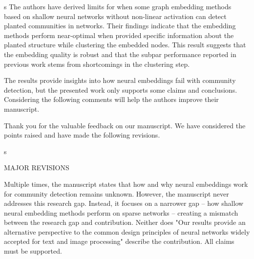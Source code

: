 \documentclass[12pt]{article}
\newcounter{comment}[subsection]
\newcommand{\rcomment}[1]{%
\vspace{10pt}
\begin{sectionbox}
s #1
\end{sectionbox}
}
\begin{document}
\rcomment{%
The authors have derived limits for when some graph embedding methods based on shallow neural networks without non-linear activation can detect planted communities in networks. Their findings indicate that the embedding methods perform near-optimal when provided specific information about the planted structure while clustering the embedded nodes. This result suggests that the embedding quality is robust and that the subpar performance reported in previous work stems from shortcomings in the clustering step. 

The results provide insights into how neural embeddings fail with community detection, but the presented work only supports some claims and conclusions. Considering the following comments will help the authors improve their manuscript.
}

Thank you for the valuable feedback on our manuscript. We have considered the  points raised and have made the following revisions.

\rcomment{

MAJOR REVISIONS 

Multiple times, the manuscript states that how and why neural embeddings work for community detection remains unknown. However, the manuscript never addresses this research gap. Instead, it focuses on a narrower gap – how shallow neural embedding methods perform on sparse networks – creating a mismatch between the research gap and contribution. Neither does "Our results provide an alternative perspective to the common design principles of neural networks widely accepted for text and image processing" describe the contribution. All claims must be supported. 
}
\end{document}
